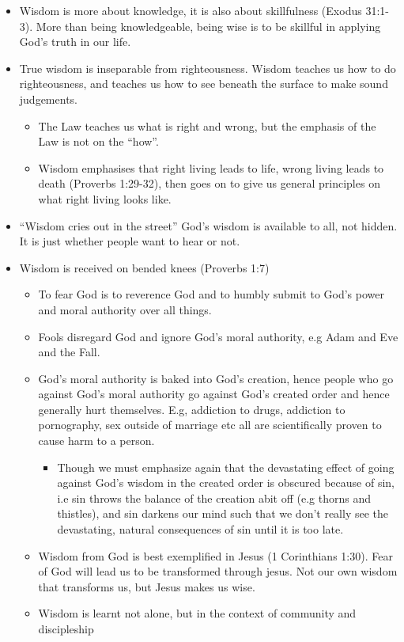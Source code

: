 \begin{itemize}
{\begin{itemize}
  \end{itemize}}
  \item{Wisdom is more about knowledge, it is also about skillfulness (Exodus
  31:1-3).  More than being knowledgeable, being wise is to be skillful in
  applying God's truth in our life.}
  \item{True wisdom is inseparable from righteousness.  Wisdom teaches us how
  to do righteousness, and teaches us how to see beneath the surface to make
  sound judgements.
  \begin{itemize}
    \item{The Law teaches us what is right and wrong, but the emphasis of the
    Law is not on the ``how''.}
    \item{Wisdom emphasises that right living leads to life, wrong living
    leads to death (Proverbs 1:29-32), then goes on to give us general
    principles on what right living looks like.}
  \end{itemize}}
  \item{``Wisdom cries out in the street'' God's wisdom is available to all,
  not hidden.  It is just whether people want to hear or not.}
  \item{Wisdom is received on bended knees (Proverbs 1:7)
  \begin{itemize}
    \item{To fear God is to reverence God and to humbly submit to God's power
    and moral authority over all things.}
    \item{Fools disregard God and ignore God's moral authority, e.g Adam and
    Eve and the Fall.}
    \item{God's moral authority is baked into God's creation, hence people
    who go against God's moral authority go against God's created order and
    hence generally hurt themselves.  E.g, addiction to drugs, addiction to
    pornography, sex outside of marriage etc all are scientifically proven to
    cause harm to a person.
    \begin{itemize}
      \item{Though we must emphasize again that the devastating effect of
      going against God's wisdom in the created order is obscured because of
      sin, i.e sin throws the balance of the creation abit off (e.g thorns
      and thistles), and sin darkens our mind such that we don't really see
      the devastating, natural consequences of sin until it is too late.}
    \end{itemize}}
  \item{Wisdom from God is best exemplified in Jesus (1 Corinthians 1:30).
  Fear of God will lead us to be transformed through jesus.  Not our own
  wisdom that transforms us, but Jesus makes us wise.}
  \item{Wisdom is learnt not alone, but in the context of community and
  discipleship}
  \end{itemize}}
\end{itemize}